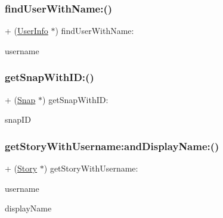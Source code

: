\subsubsection{\texorpdfstring{find\+User\+With\+Name\+:()}{findUserWithName:()}}
{\footnotesize\ttfamily + (\hyperlink{interface_user_info}{User\+Info} $\ast$) find\+User\+With\+Name\+: \begin{DoxyParamCaption}\item[{(N\+S\+String $\ast$)}]{username }\end{DoxyParamCaption}}

\hypertarget{interface_snap_read_a6344aec7f2fa64dca5a03cf17965c0f4}{}\label{interface_snap_read_a6344aec7f2fa64dca5a03cf17965c0f4} 
\subsubsection{\texorpdfstring{get\+Snap\+With\+I\+D\+:()}{getSnapWithID:()}}
{\footnotesize\ttfamily + (\hyperlink{interface_snap}{Snap} $\ast$) get\+Snap\+With\+I\+D\+: \begin{DoxyParamCaption}\item[{(N\+S\+String $\ast$)}]{snap\+ID }\end{DoxyParamCaption}}

\hypertarget{interface_snap_read_afd0c4d40ba860bc9b408c7338d3e5112}{}\label{interface_snap_read_afd0c4d40ba860bc9b408c7338d3e5112} 
\subsubsection{\texorpdfstring{get\+Story\+With\+Username\+:and\+Display\+Name\+:()}{getStoryWithUsername:andDisplayName:()}}
{\footnotesize\ttfamily + (\hyperlink{interface_story}{Story} $\ast$) get\+Story\+With\+Username\+: \begin{DoxyParamCaption}\item[{(N\+S\+String $\ast$)}]{username }\item[{andDisplayName:(N\+S\+String $\ast$)}]{display\+Name }\end{DoxyParamCaption}}

